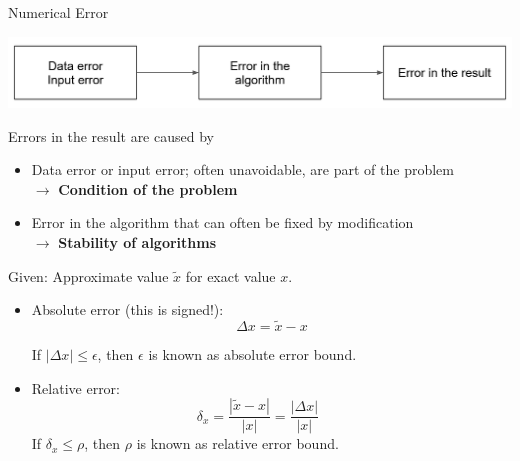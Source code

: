 










\begin{vbframe}{Numerical Error}

\begin{center}
\includegraphics{figure_man/error_sources.PNG}
\end{center}

Errors in the result are caused by
\begin{itemize}
\item Data error or input error; often unavoidable, are part of the problem \\ $\to$ \textbf{Condition of the problem}
\item Error in the algorithm that can often be fixed by modification \\ $\to$ \textbf{Stability of algorithms}
\end{itemize}


\framebreak

Given: Approximate value $\tilde x$ for exact value $x$.

\begin{itemize}
\item Absolute error (this is signed!):
$$
  \Delta x = \tilde x - x
$$

If $|\Delta x| \le \epsilon$, then $\epsilon$ is known as absolute error bound.

\item Relative error:
$$
  \delta_x = \frac{|\tilde x - x|}{|x|} = \frac{|\Delta x|}{|x|}\qquad
$$
If $\delta_x \le \rho$, then $\rho$ is known as relative error bound.
\end{itemize}


\end{vbframe}
